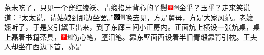 茶未吃了，只见一个穿红绫袄、青缎掐牙背心的丫鬟{\includegraphics[width=3mm]{../Images/00002}\includegraphics[width=3mm]{../Images/00011}\footnotesize \kaishu 金乎？玉乎？}走来笑说道：``太太说，请姑娘到那边坐罢。''{\includegraphics[width=3mm]{../Images/00006}\includegraphics[width=3mm]{../Images/00011}\footnotesize \kaishu 唤去见，方是舅母，方是大家风范。}老嬷嬷听了，于是又引黛玉出来，到了东廊三间小正房内。正面炕上横设一张炕桌，桌上磊着书籍茶具，{\includegraphics[width=3mm]{../Images/00002}\includegraphics[width=3mm]{../Images/00011}\footnotesize \kaishu 伤心笔，堕泪笔。}靠东壁面西设着半旧青缎靠背引枕。王夫人却坐在西边下首，亦是